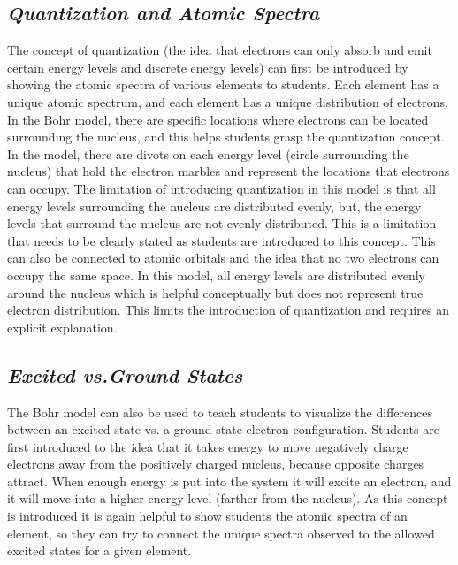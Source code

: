 \documentclass[11pt]{sig-alternate}
\begin{document}
\begin{large}
\subsection*{\textit{Quantization and Atomic Spectra}}
The concept of quantization (the idea that electrons can only absorb and emit certain energy levels and discrete energy levels) can first be introduced by showing the atomic spectra of various elements to students. Each element has a unique atomic spectrum, and each element has a unique distribution of electrons. In the Bohr model, there are specific locations where electrons can be located surrounding the nucleus, and this helps students grasp the quantization concept. In the model, there are divots on each energy level (circle surrounding the nucleus) that hold the electron marbles and represent the locations that electrons can occupy. The limitation of introducing quantization in this model is that all energy levels surrounding the nucleus are distributed evenly, but, the energy levels that surround the nucleus are not evenly distributed. This is a limitation that needs to be clearly stated as students are introduced to this concept. This can also be connected to atomic orbitals and the idea that no two electrons can occupy the same space. In this model, all energy levels are distributed evenly around the nucleus which is helpful conceptually but does not represent true electron distribution. This limits the introduction of quantization and requires an explicit explanation.

\subsection*{\textit{Excited vs.Ground States}}

The Bohr model can also be used to teach students to visualize the differences between an excited state vs. a ground state electron configuration. Students are first introduced to the idea that it takes energy to move negatively charge electrons away from the positively charged nucleus, because opposite charges attract. When enough energy is put into the system it will excite an electron, and it will move into a higher energy level (farther from the nucleus). As this concept is introduced it is again helpful to show students the atomic spectra of an element, so they can try to connect the unique spectra observed to the allowed excited states for a given element.


\end{large}
\end{document}
